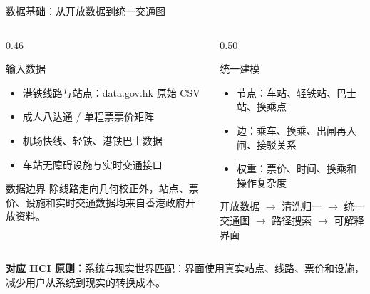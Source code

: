 \documentclass[aspectratio=169,10pt]{beamer}
\newcommand{\hciprinciple}[1]{\vspace{0.25em}\textcolor{MTRPurple}{\small\textbf{对应 HCI 原则：}#1}}
\begin{document}
\begin{frame}{数据基础：从开放数据到统一交通图}
  \begin{columns}[T,onlytextwidth]
    \begin{column}{0.46\textwidth}
      \begin{block}{输入数据}
        \begin{itemize}
          \item 港铁线路与站点：data.gov.hk 原始 CSV
          \item 成人八达通 / 单程票票价矩阵
          \item 机场快线、轻铁、港铁巴士数据
          \item 车站无障碍设施与实时交通接口
        \end{itemize}
      \end{block}
      \begin{block}{数据边界}
        除线路走向几何校正外，站点、票价、设施和实时交通数据均来自香港政府开放资料。
      \end{block}
    \end{column}
    \begin{column}{0.50\textwidth}
      \begin{block}{统一建模}
        \begin{itemize}
          \item 节点：车站、轻铁站、巴士站、换乘点
          \item 边：乘车、换乘、出闸再入闸、接驳关系
          \item 权重：票价、时间、换乘和操作复杂度
        \end{itemize}
      \end{block}
      \begin{center}
        \small
        开放数据 $\to$ 清洗归一 $\to$ 统一交通图 $\to$ 路径搜索 $\to$ 可解释界面
      \end{center}
    \end{column}
  \end{columns}
  \hciprinciple{系统与现实世界匹配：界面使用真实站点、线路、票价和设施，减少用户从系统到现实的转换成本。}
\end{frame}
\end{document}
